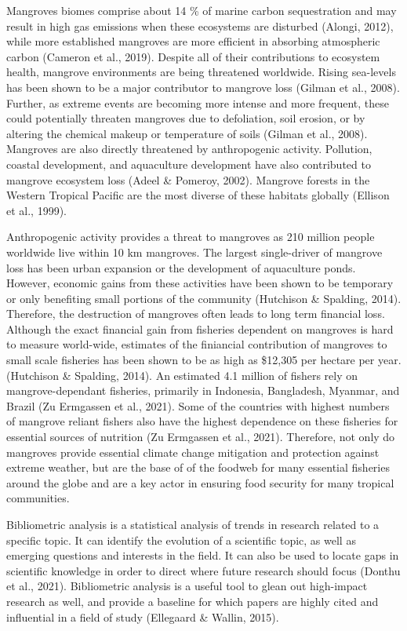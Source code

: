 \documentclass[
  12pt,
]{article}
\begin{document}
Mangroves biomes comprise about 14 \% of marine carbon sequestration and may result in high gas emissions when these ecosystems are disturbed (Alongi, 2012), while more established mangroves are more efficient in absorbing atmospheric carbon (Cameron et al., 2019). Despite all of their contributions to ecosystem health, mangrove environments are being threatened worldwide. Rising sea-levels has been shown to be a major contributor to mangrove loss (Gilman et al., 2008). Further, as extreme events are becoming more intense and more frequent, these could potentially threaten mangroves due to defoliation, soil erosion, or by altering the chemical makeup or temperature of soils (Gilman et al., 2008). Mangroves are also directly threatened by anthropogenic activity. Pollution, coastal development, and aquaculture development have also contributed to mangrove ecosystem loss (Adeel \& Pomeroy, 2002). Mangrove forests in the Western Tropical Pacific are the most diverse of these habitats globally (Ellison et al., 1999).

Anthropogenic activity provides a threat to mangroves as 210 million people worldwide live within 10 km mangroves. The largest single-driver of mangrove loss has been urban expansion or the development of aquaculture ponds. However, economic gains from these activities have been shown to be temporary or only benefiting small portions of the community (Hutchison \& Spalding, 2014). Therefore, the destruction of mangroves often leads to long term financial loss. Although the exact financial gain from fisheries dependent on mangroves is hard to measure world-wide, estimates of the finiancial contribution of mangroves to small scale fisheries has been shown to be as high as \$12,305 per hectare per year. (Hutchison \& Spalding, 2014). An estimated 4.1 million of fishers rely on mangrove-dependant fisheries, primarily in Indonesia, Bangladesh, Myanmar, and Brazil (Zu Ermgassen et al., 2021). Some of the countries with highest numbers of mangrove reliant fishers also have the highest dependence on these fisheries for essential sources of nutrition (Zu Ermgassen et al., 2021). Therefore, not only do mangroves provide essential climate change mitigation and protection against extreme weather, but are the base of of the foodweb for many essential fisheries around the globe and are a key actor in ensuring food security for many tropical communities.

Bibliometric analysis is a statistical analysis of trends in research related to a specific topic. It can identify the evolution of a scientific topic, as well as emerging questions and interests in the field. It can also be used to locate gaps in scientific knowledge in order to direct where future research should focus (Donthu et al., 2021). Bibliometric analysis is a useful tool to glean out high-impact research as well, and provide a baseline for which papers are highly cited and influential in a field of study (Ellegaard \& Wallin, 2015).
\end{document}
